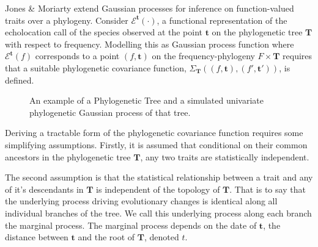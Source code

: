 \documentclass[wsdraft]{ws-rv9x6} %
\begin{document}
Jones \& Moriarty\cite{jones2013evolutionary} extend Gaussian processes for inference on function-valued traits over a phylogeny. Consider \(\mathcal{E}^{\mathbf{t}}(\cdot)\), a functional representation of the echolocation call of the species observed at the point \(\mathbf{t}\) on the phylogenetic tree \(\mathbf{T}\) with respect to frequency. Modelling this as Gaussian process function where \(\mathcal{E}^{\mathbf{t}}(f)\) corresponds to a point \((f, \mathbf{t})\) on the frequency-phylogeny \(F \times \mathbf{T}\) requires that a suitable phylogenetic covariance function, \(\Sigma_{\mathbf{T}}\left((f,\mathbf{t}), (f',\mathbf{t}')\right)\), is defined.

\begin{figure}[h]
	\caption{An example of a Phylogenetic Tree and a simulated univariate phylogenetic Gaussian process of that tree.}
\end{figure}

Deriving a tractable form of the phylogenetic covariance function requires some simplifying assumptions. Firstly, it is assumed that conditional on their common ancestors in the phylogenetic tree \(\mathbf{T}\), any two traits are statistically independent. 

The second assumption is that the statistical relationship between a trait and any of it's descendants in \(\mathbf{T}\) is independent of the topology of \(\mathbf{T}\). That is to say that the underlying process driving evolutionary changes is identical along all individual branches of the tree. We call this underlying process along each branch the marginal process. The marginal process depends on the date of \(\mathbf{t}\), the distance between \(\mathbf{t}\) and the root of \(\mathbf{T}\), denoted \(t\). 
\end{document}
